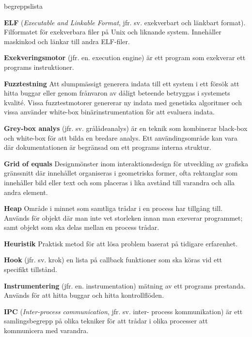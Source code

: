 \begin{labeling}{begreppslista}
    \item [\textbf{ELF}] (\emph{Executable and Linkable Format}, jfr. sv.
          exekverbart och länkbart format). Filformatet för exekverbara filer på Unix
    och liknande system. Innehåller maskinkod och länkar till andra ELF-filer.

    \item [\textbf{Exekveringsmotor}] (jfr. en. execution engine) är ett program
    som exekverar ett programs instruktioner.

    \item [\textbf{Fuzztestning}] Att slumpmässigt generera indata till ett
    system i ett försök att hitta buggar eller genom frånvaron av dåligt
    beteende betryggas i systemets kvalité. Vissa fuzztestmotorer genererar ny
    indata med genetiska algoritmer och vissa använder white-box
    binärinstrumentation för att evaluera indata.

    \item [\textbf{Grey-box analys}] (jfr. sv. grålådeanalys) är en teknik som
    kombinerar black-box och white-box för att bilda en bredare analys. Ett
    användingsområde kan vara där  dokumentationen är begränsad om ett programs
    interna struktur.

    \item [\textbf{Grid of equals}] Designmönster inom interaktionsdesign för
    utveckling av grafiska gränssnitt där innehållet organiseras i geometriska
    former, ofta rektanglar som innehåller bild eller text och som placeras i
    lika avstånd till varandra och alla andra element.

    \item [\textbf{Heap}] Område i minnet som samtliga trådar i en process har
    tillgång till. Används för objekt där man inte vet storleken innan man
    exeverar programmet; samt objekt som ska delas mellan en process trådar.

    \item [\textbf{Heuristik}] Praktisk metod för att lösa problem baserat på
    tidigare erfarenhet.

    \item [\textbf{Hook}] (jfr. sv. krok) en lista på callback funktioner som
    ska köras vid ett specifikt tillstånd.

    \item [\textbf{Instrumentering}] (jfr. en. instrumentation) mätning av ett
    programs prestanda. Används för att hitta buggar och hitta kontrollflöden.

    \item [\textbf{IPC}] (\emph{Inter-process communication}, jfr. sv. inter-
          process kommunikation) är ett samlingsbegrepp på olika tekniker för att
    trådar i olika processer att kommunicera med varandra.


\end{labeling}
